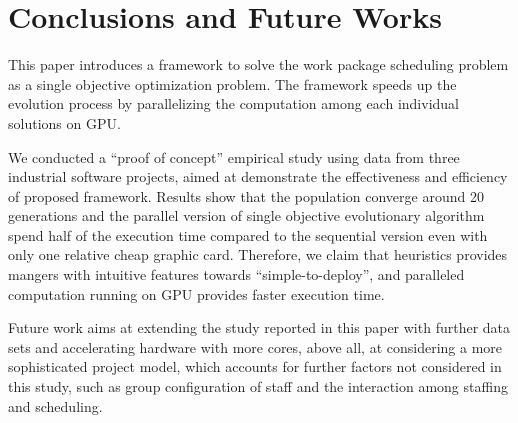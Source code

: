 %
%

\section{Conclusions and Future Works}
%
This paper introduces a framework to solve the work package scheduling problem as a single objective optimization problem. The framework speeds up the evolution process by parallelizing the computation among each individual solutions on GPU. 

We conducted a ``proof of concept'' empirical study using data from three industrial software projects, aimed at demonstrate the effectiveness and efficiency of proposed framework.
Results show that the population converge around 20 generations and the parallel version of single objective evolutionary algorithm spend half of the execution time compared to the sequential version even with only one relative cheap graphic card. 
Therefore, we claim that heuristics provides mangers with intuitive features towards ``simple-to-deploy'', and paralleled computation running on GPU provides faster execution time.

Future work aims at extending the study reported in this paper with further data sets and accelerating hardware with more cores, above all, at considering a more sophisticated project model, which accounts for further factors not considered in this study, such as group configuration of staff and the interaction among staffing and scheduling.